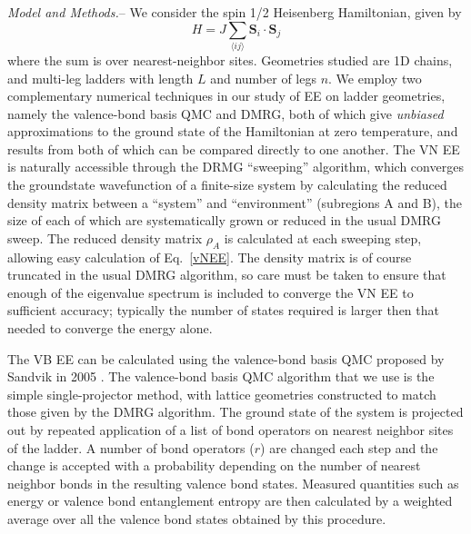\documentclass[prl,aps,twocolumn,floatfix,amsmath,amssymb,superscriptaddress,tightenlines]{revtex4}
\begin{document}
{\it Model and Methods.}-- We consider the spin 1/2 Heisenberg
Hamiltonian, given by \begin{equation} H = J \sum_{\langle i j \rangle}
{\mathbf S}_i \cdot {\mathbf S}_j \label{ham} \end{equation} where the sum
is over nearest-neighbor sites.  Geometries studied are 1D chains, and
multi-leg ladders with length $L$ and number of legs $n$.  
We employ two complementary numerical techniques in our study of EE on
ladder geometries, namely the valence-bond basis QMC and DMRG, both of
which give {\it unbiased} approximations to the ground state of the
Hamiltonian at zero temperature, and results from both of which can be
compared directly to one another.  The VN EE is naturally accessible
through the DRMG ``sweeping'' algorithm, which converges the groundstate
wavefunction of a finite-size system by calculating the reduced density
matrix between a ``system'' and ``environment'' (subregions A and B), the
size of each of which are systematically grown or reduced in the usual
DMRG sweep.  The reduced density matrix $\rho_A$ is calculated at each
sweeping step, allowing easy calculation of Eq.~\ref{vNEE}.  The density
matrix is of course truncated in the usual DMRG algorithm, so care must be
taken to ensure that enough of the eigenvalue spectrum is included to
converge the VN EE to sufficient accuracy; typically the number of states
required is larger then that needed to converge the energy alone.

The VB EE can be calculated using the valence-bond basis QMC proposed by
Sandvik in 2005 \cite{Sandvik}.  The valence-bond basis QMC algorithm that
we use is the simple single-projector method, with lattice geometries
constructed to match those given by the DMRG algorithm.  The ground state
of the system is projected out by repeated application of a list of bond
operators on nearest neighbor sites of the ladder.  A number of bond
operators ($r$) are changed each step and the change is accepted with a
probability depending on the number of nearest neighbor bonds in the
resulting valence bond states.  Measured quantities such as energy or
valence bond entanglement entropy are then calculated by a weighted
average over all the valence bond states obtained by this procedure.
\end{document}
